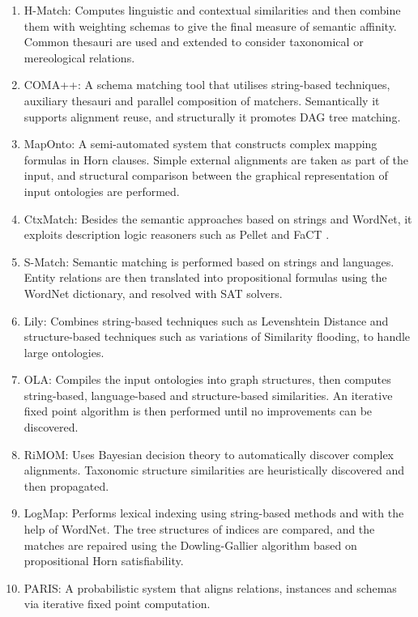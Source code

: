 \begin{spacing}{1.2}
\begin{enumerate}
	\item H-Match: Computes linguistic and contextual similarities and then combine them with weighting schemas to give the final measure of semantic affinity. Common thesauri are used and extended to consider taxonomical or mereological relations.
	\item COMA++: A schema matching tool that utilises string-based techniques, auxiliary thesauri and parallel composition of matchers. Semantically it supports alignment reuse, and structurally it promotes DAG tree matching.
	\item MapOnto: A semi-automated system that constructs complex mapping formulas in Horn clauses. Simple external alignments are taken as part of the input, and structural comparison between the graphical representation of input ontologies are performed.
	\item CtxMatch: Besides the semantic approaches based on strings and WordNet, it exploits description logic reasoners such as Pellet \cite{DBLP:journals/ws/SirinPGKK07} and FaCT \cite{DBLP:conf/cade/TsarkovH06}.
	\item S-Match: Semantic matching is performed based on strings and languages. Entity relations are then translated into propositional formulas using the WordNet dictionary, and resolved with SAT solvers.
	\item Lily: Combines string-based techniques such as Levenshtein Distance and structure-based techniques such as variations of Similarity flooding, to handle large ontologies.
	\item OLA: Compiles the input ontologies into graph structures, then computes string-based, language-based and structure-based similarities. An iterative fixed point algorithm is then performed until no improvements can be discovered.
	\item RiMOM: Uses Bayesian decision theory to automatically discover complex alignments. Taxonomic structure similarities are heuristically discovered and then propagated.
	\item LogMap: Performs lexical indexing using string-based methods and with the help of WordNet. The tree structures of indices are compared, and the matches are repaired using the Dowling-Gallier algorithm based on propositional Horn satisfiability.
	\item PARIS: A probabilistic system that aligns relations, instances and schemas via iterative fixed point computation.
\end{enumerate}
\end{spacing}

